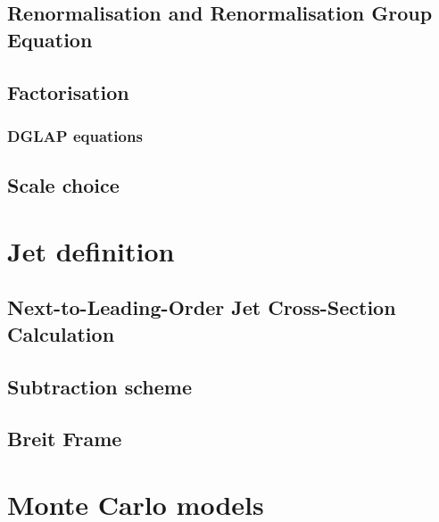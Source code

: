 \subsection{Renormalisation and Renormalisation Group Equation}


\subsection{Factorisation}
\label{subsec:factorisation}


\subsubsection{DGLAP equations}


\subsection{Scale choice}


\section{Jet definition}
\label{sec:jetalgo}


\subsection{Next-to-Leading-Order Jet Cross-Section Calculation}


\subsection{Subtraction scheme}
\label{subsec:subscheme}


\subsection{Breit Frame}
\label{subsec:breitframe}


%

\section{Monte Carlo models}
